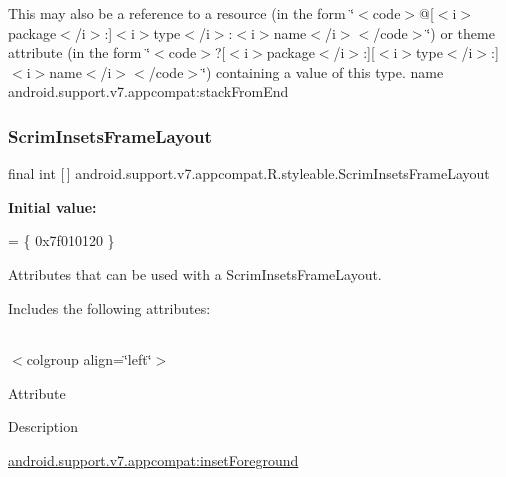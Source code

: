 This may also be a reference to a resource (in the form \char`\"{}$<$code$>$@\mbox{[}$<$i$>$package$<$/i$>$\+:\mbox{]}$<$i$>$type$<$/i$>$\+:$<$i$>$name$<$/i$>$$<$/code$>$\char`\"{}) or theme attribute (in the form \char`\"{}$<$code$>$?\mbox{[}$<$i$>$package$<$/i$>$\+:\mbox{]}\mbox{[}$<$i$>$type$<$/i$>$\+:\mbox{]}$<$i$>$name$<$/i$>$$<$/code$>$\char`\"{}) containing a value of this type.  name android.\+support.\+v7.\+appcompat\+:stack\+From\+End \mbox{\label{classandroid_1_1support_1_1v7_1_1appcompat_1_1R_1_1styleable_af376156dde80b171fe1fca622ce00921}} 
\subsubsection{\texorpdfstring{Scrim\+Insets\+Frame\+Layout}{ScrimInsetsFrameLayout}}
{\footnotesize\ttfamily final int \mbox{[}$\,$\mbox{]} android.\+support.\+v7.\+appcompat.\+R.\+styleable.\+Scrim\+Insets\+Frame\+Layout\hspace{0.3cm}{\ttfamily [static]}}

{\bfseries Initial value\+:}
\begin{DoxyCode}
= \{
            0x7f010120
        \}
\end{DoxyCode}
Attributes that can be used with a Scrim\+Insets\+Frame\+Layout. 

Includes the following attributes\+:

\tabulinesep=1mm
\begin{longtabu} spread 0pt [c]{*{0}{|X[-1]}|}
\hline
\end{longtabu}
$<$colgroup align=\char`\"{}left\char`\"{}$>$ 

Attribute

Description 

{\ttfamily \hyperlink{classandroid_1_1support_1_1v7_1_1appcompat_1_1R_1_1styleable_a313bb6eaa7f60f9308d2d585cff17d58}{android.\+support.\+v7.\+appcompat\+:inset\+Foreground}}

